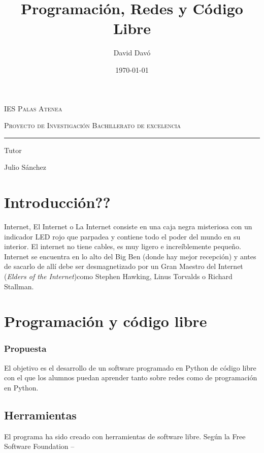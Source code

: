 \documentclass[a4paper, 11pt]{report} %
\title{Programación, Redes y Código Libre}
\author{David Davó}
\date{\today{}}
\begin{document}
\makeatletter
\begin{titlepage}
\centering
\vspace*{4cm}
{\scshape\LARGE IES Palas Atenea \par}
\vspace{1cm}
{\scshape\Large Proyecto de Investigación Bachillerato de excelencia\par}
\vspace{1.5cm}
{\huge\bfseries \@title\par}
\rule{0.5\textwidth}{1pt}\par
\vspace{2cm}
{\Large\itshape \@author\par}
\vfill
Tutor\par
Julio Sánchez

\vfill

{\large \@date\par}
\end{titlepage}
\clearpage

\tableofcontents
\newpage{}
\setcounter{chapter}{-1}

\chapter{Introducción??}
Internet, El Internet o La Internet consiste en una caja negra misteriosa con un indicador LED rojo que parpadea y contiene todo el poder del mundo en su interior. El internet no tiene cables, es muy ligero e increíblemente pequeño. Internet se encuentra en lo alto del Big Ben (donde hay mejor recepción) y antes de sacarlo de allí debe ser desmagnetizado por un Gran Maestro del Internet (\textit{Elders of the Internet})como Stephen Hawking, Linus Torvalds o Richard Stallman. \cite{ITCr}

\chapter{Programación y código libre}

\subsection*{Propuesta}
El objetivo es el desarrollo de un software programado en Python de código libre con el que los alumnos puedan aprender tanto sobre redes como de programación en Python.

\section{Herramientas}
El programa ha sido creado con herramientas de software libre. Según la Free Software Foundation
--\cite{FSF-Ph}
\end{document}
